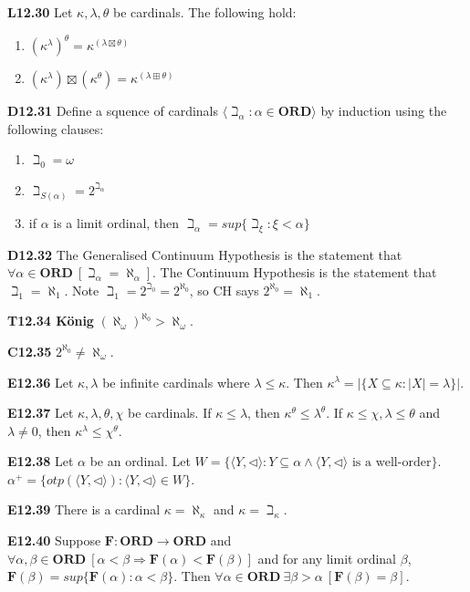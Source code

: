 \documentclass[10pt, landscape]{article}
\begin{document}
\begin{multicols*}{3}
\textbf{L12.30} Let $\kappa, \lambda, \theta$ be cardinals. The following hold:
\begin{enumerate}
    \item $(\kappa^\lambda)^\theta=\kappa^{(\lambda\boxtimes\theta)}$
    \item $(\kappa^\lambda)\boxtimes(\kappa^\theta)=\kappa^{(\lambda\boxplus\theta)}$
\end{enumerate}

\textbf{D12.31} Define a squence of cardinals $\langle\beth_\alpha:\alpha\in\mathbf{ORD}\rangle$ by induction using the following clauses:
\begin{enumerate}
    \item $\beth_0=\omega$
    \item $\beth_{S(\alpha)}=2^{\beth_\alpha}$
    \item if $\alpha$ is a limit ordinal, then $\beth_\alpha=sup\{\beth_\xi:\xi<\alpha\}$
\end{enumerate}

\textbf{D12.32} The Generalised Continuum Hypothesis is the statement that $\forall \alpha \in \mathbf{ORD}\ [\beth_\alpha=\aleph_\alpha]$. The Continuum Hypothesis is the statement that $\beth_1=\aleph_1$. Note $\beth_1=2^{\beth_0}=2^{\aleph_0}$, so CH says $2^{\aleph_0}=\aleph_1$.

\textbf{T12.34 König} $(\aleph_\omega)^{\aleph_0}>\aleph_\omega$.

\textbf{C12.35} $2^{\aleph_0}\neq\aleph_\omega$.

\textbf{E12.36} Let $\kappa,\lambda$ be infinite cardinals where $\lambda \leq \kappa$. Then $\kappa^\lambda=|\{X\subseteq\kappa:|X|=\lambda\}|$.

\textbf{E12.37} Let $\kappa, \lambda, \theta, \chi$ be cardinals. If $\kappa \leq \lambda$, then $\kappa^\theta \leq \lambda^\theta$. If $\kappa\leq\chi, \lambda \leq \theta$ and $\lambda\neq0$, then $\kappa^\lambda \leq \chi^\theta$.

\textbf{E12.38} Let $\alpha$ be an ordinal. Let $W = \{\langle Y, \lhd \rangle : Y \subseteq \alpha \land \langle Y, \lhd \rangle \text{ is a well-order}\}$. $\alpha^+=\{otp(\langle Y, \lhd \rangle):\langle Y, \lhd \rangle \in W\}$.

\textbf{E12.39} There is a cardinal $\kappa=\aleph_\kappa$ and $\kappa=\beth_\kappa$.

\textbf{E12.40} Suppose $\mathbf{F:ORD\rightarrow ORD}$ and $\forall \alpha, \beta \in \mathbf{ORD} \ [\alpha < \beta \Longrightarrow \mathbf{F}(\alpha)<\mathbf{F}(\beta)]$ and for any limit ordinal $\beta$, $\mathbf{F}(\beta)=sup\{\mathbf{F}(\alpha):\alpha<\beta\}$. Then $\forall \alpha \in \mathbf{ORD}\ \exists \beta > \alpha \ [\mathbf{F}(\beta)=\beta]$.


\end{multicols*}
\end{document}
